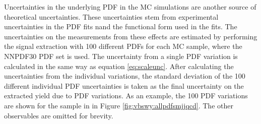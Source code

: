 Uncertainties in the underlying PDF in the MC simulations are another source of theoretical uncertainties. These uncertainties stem from experimental uncertainties in the PDF fits nand the functional form used in the fits. The uncertainties on the measurements from these effects are estimated by performing the signal extraction with 100 different PDFs for each MC sample, where the NNPDF30 \cite{Insitu:nnpdf} PDF set is used. The uncertainty from a single PDF variation is calculated in the same way as equation \ref{eq:scaleunc}. After calculating the uncertainties from the individual variations, the standard deviation of the 100 different individual PDF uncertainties is taken as the final uncertainty on the extracted \ewwy yield due to PDF variations. As an example, the 100 PDF variations are shown for the \qcdwy sample in \mjj in Figure \ref{fig:vbswy:allpdfsmjjqcd}. The other observables are omitted for brevity.

